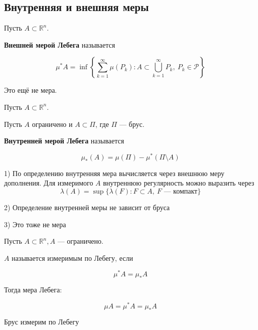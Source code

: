 \documentclass[12pt,a4paper]{article}
\begin{document}
\subsection{Внутренняя и внешняя меры}

\begin{definition}
    Пусть $A\subset\mathbb{R}^n$.

    \textbf{Внешней мерой Лебега} называется

    \[
        \mu^*A=
        \inf\left\{
        \sum_{k=1}^{\infty}\mu(P_k):
        A\subset\bigcup_{k=1}^{\infty}P_k,\
        P_k\in\mathcal P
        \right\}
    \]

    \begin{note}

        Это ещё не мера.

    \end{note}

\end{definition}

\begin{definition}
    Пусть $A\subset\mathbb{R}^n$.

    Пусть $A$ ограничено и $A\subset\Pi$, где $\Pi$ --- брус.\par
    \textbf{Внутренней мерой Лебега} называется

    \[
        \mu_*(A)=\mu(\Pi)-\mu^*(\Pi\setminus A)
    \]

    \begin{note}

        1) По определению внутренняя мера вычисляется через внешнюю меру дополнения.
        Для измеримого $A$ внутреннюю регулярность можно выразить через
        \[
            \lambda(A)=\sup\{\lambda(F):F\subset A,\ F\text{ --- компакт}\}
        \]

        2) Определение внутренней меры не зависит от бруса

        3) Это тоже не мера

    \end{note}

\end{definition}

\begin{definition}
    Пусть $A\subset\mathbb{R}^n, A$ — ограничено.

    $A$ называется измеримым по Лебегу, если

    \[
        \mu^*A=\mu_*A
    \]

    Тогда мера Лебега:

    \[
        \mu A=\mu^*A=\mu_*A
    \]

    \begin{note}

        Брус измерим по Лебегу

    \end{note}

\end{definition}
\end{document}
